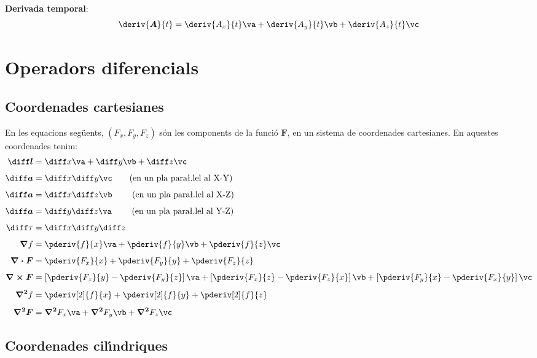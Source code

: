 \documentclass[catalan,a4paper,twoside,11pt]{article}
\begin{document}
\textbf{Derivada temporal}:
\begin{equation}
    \deriv{\boldsymbol{A}}{t} = \deriv{A_x}{t}\va +
    \deriv{A_y}{t}\vb + \deriv{A_z}{t}\vc
\end{equation}


\section{Operadors diferencials }

\subsection{Coordenades cartesianes}

En les equacions seg\"{u}ents, $(F_x,F_y,F_z)$  s\'{o}n les
components de la funci\'{o}  $\boldsymbol{F}$, en un sistema de
coordenades cartesianes. En aquestes coordenades tenim:
\begin{align}
    \boldsymbol{\diff l} &= \diff x \va + \diff y \vb + \diff z \vc\\[1ex]
    \boldsymbol{\diff a} &= \diff x \diff y \vc \qquad\text{(en un pla
    para{\l.l}el al X-Y)}\\[1ex]
    \boldsymbol{\diff a} &= \diff x \diff z \vb \qquad\text{ (en un pla
    para{\l.l}el al X-Z)}\\[1ex]
    \boldsymbol{\diff a} &= \diff y \diff z \va \qquad\text{ (en un pla
    para{\l.l}el al Y-Z)}\\[1ex]
    \diff\tau &= \diff x \diff y \diff z\\[1ex]
    \boldsymbol{\nabla}f &= \pderiv{f}{x}\va + \pderiv{f}{y}\vb
    + \pderiv{f}{z}\vc\\[1ex]
    \boldsymbol{\nabla\cdot F} &= \pderiv{F_x}{x} + \pderiv{F_y}{y}
    + \pderiv{F_z}{z}\\[1ex]
    \boldsymbol{\nabla\times F} &= \left[\pderiv{F_z}{y}-\pderiv{F_y}{z}\right]\va +
    \left[\pderiv{F_x}{z}-\pderiv{F_z}{x}\right]\vb +
    \left[\pderiv{F_y}{x}-\pderiv{F_x}{y}\right]\vc\\[1ex]
    \boldsymbol{\nabla^2}f &= \pderiv[2]{f}{x} + \pderiv[2]{f}{y}+ \pderiv[2]{f}{z}\\[1ex]
    \boldsymbol{\nabla^2F} &= \boldsymbol{\nabla^2} F_x \va + \boldsymbol{\nabla^2} F_y
    \vb + \boldsymbol{\nabla^2} F_z \vc
\end{align}

\subsection{Coordenades cil\'{\i}ndriques}
\end{document}
